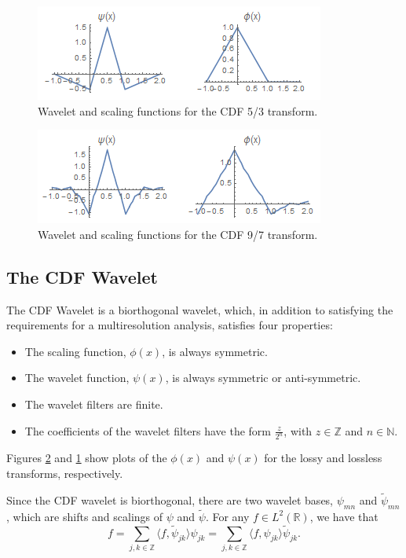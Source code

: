 \documentclass[titlepage,12pt]{article}
\begin{document}
\begin{figure}[h]
	\centering
	\includegraphics[scale=0.9]{resources/lossless_family.png}
	\caption{Wavelet and scaling functions for the CDF 5/3 transform.}
	\label{fig:lossless_family}
\end{figure}

\begin{figure}[h]
	\centering
	\includegraphics[scale=0.9]{resources/lossy_family.png}
	\caption{Wavelet and scaling functions for the CDF 9/7 transform.}
	\label{fig:lossy_family}
\end{figure}

\subsection{The CDF Wavelet}

The CDF Wavelet is a biorthogonal wavelet, which, in addition to satisfying the requirements for a multiresolution analysis,
satisfies four properties\cite{old}:
\begin{itemize}
	\item The scaling function, $\phi(x)$, is always symmetric.
	\item The wavelet function, $\psi(x)$, is always symmetric or anti-symmetric.
	\item The wavelet filters are finite.
	\item The coefficients of the wavelet filters have the form $\frac{z}{2^n}$, with $z\in\mathbb{Z}$ and $n\in\mathbb{N}$.
\end{itemize}
Figures \ref{fig:lossy_family} and \ref{fig:lossless_family} show plots of the $\phi(x)$
and $\psi(x)$ for the lossy and lossless transforms, respectively.

Since the CDF wavelet is biorthogonal, there are two wavelet bases, $\psi_{mn}$ and $\tilde{\psi}_{mn}$,
which are shifts and scalings of $\psi$ and $\tilde{\psi}$.\cite{cdf}
For any $f\in L^2(\mathbb{R})$, we have that
\begin{equation}
	f = \sum_{j,k\in\mathbb{Z}}\langle f,\tilde{\psi}_{jk}\rangle\psi_{jk}=\sum_{j,k\in\mathbb{Z}}\langle f,\psi_{jk}\rangle\tilde{\psi}_{jk}.
\end{equation}
\end{document}
